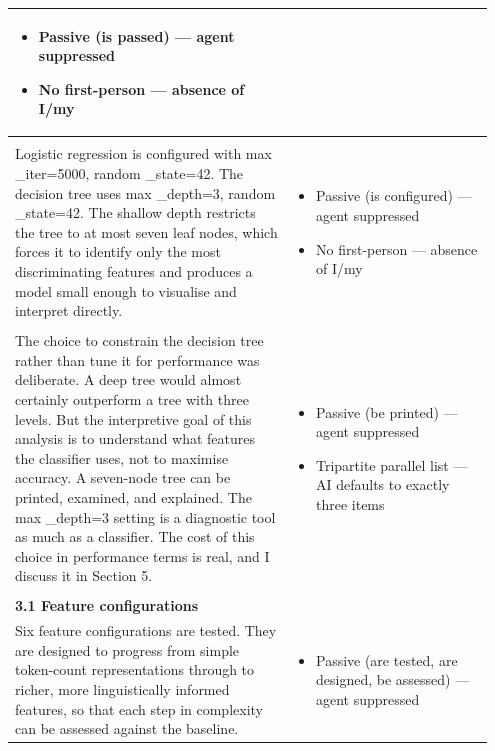 \documentclass[11pt]{article}
\begin{document}
\begin{longtable}{|p{0.55\linewidth}|p{0.40\linewidth}|}
\begin{itemize}[leftmargin=1em,itemsep=1pt,topsep=1pt,parsep=0pt]
  \item Passive (is passed) --- agent suppressed
  \item No first-person --- absence of I/my
\end{itemize} \\[2pt]
\hline
\rule[-3.5cm]{0pt}{3.5cm} & \\
\hline
Logistic regression is configured with max \_iter=5000, random \_state=42. The decision tree uses max \_depth=3, random \_state=42. The shallow depth restricts the tree to at most seven leaf nodes, which forces it to identify only the most discriminating features and produces a model small enough to visualise and interpret directly. & \begin{itemize}[leftmargin=1em,itemsep=1pt,topsep=1pt,parsep=0pt]
  \item Passive (is configured) --- agent suppressed
  \item No first-person --- absence of I/my
\end{itemize} \\[2pt]
\hline
\rule[-3.5cm]{0pt}{3.5cm} & \\
\hline
The choice to constrain the decision tree rather than tune it for performance was deliberate. A deep tree would almost certainly outperform a tree with three levels. But the interpretive goal of this analysis is to understand what features the classifier uses, not to maximise accuracy. A seven-node tree can be printed, examined, and explained. The max \_depth=3 setting is a diagnostic tool as much as a classifier. The cost of this choice in performance terms is real, and I discuss it in Section 5. & \begin{itemize}[leftmargin=1em,itemsep=1pt,topsep=1pt,parsep=0pt]
  \item Passive (be printed) --- agent suppressed
  \item Tripartite parallel list --- AI defaults to exactly three items
\end{itemize} \\[2pt]
\hline
\rule[-3.5cm]{0pt}{3.5cm} & \\
\hline
\textbf{3.1 Feature configurations}\\[4pt]
Six feature configurations are tested. They are designed to progress from simple token-count representations through to richer, more linguistically informed features, so that each step in complexity can be assessed against the baseline. & \begin{itemize}[leftmargin=1em,itemsep=1pt,topsep=1pt,parsep=0pt]
  \item Passive (are tested, are designed, be assessed) --- agent suppressed

\end{itemize}
\end{longtable}
\end{document}
